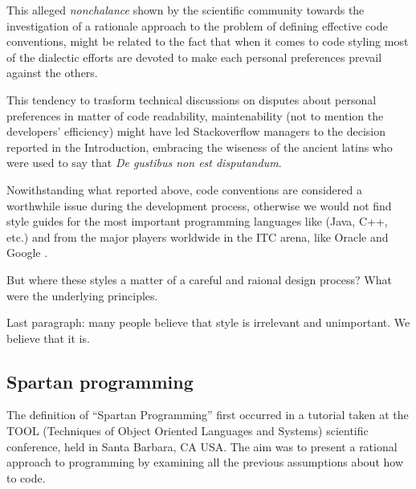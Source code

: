 This alleged \emph{nonchalance} shown by the scientific community towards the investigation 
of a rationale approach to the problem of defining effective code conventions, might be 
related to the fact that when it comes to code styling most of the dialectic efforts are devoted
to make each personal preferences prevail against the others.

This tendency to trasform technical discussions on disputes about personal preferences 
in matter of code readability, maintenability (not to mention the developers' efficiency) might 
have led Stackoverflow managers to the decision reported in the Introduction, embracing the 
wiseness of the ancient latins who were used to say that \emph{De gustibus non est disputandum}.

Nowithstanding what reported above, code conventions are considered a worthwhile issue during 
the development process, otherwise we would not find style guides for the most important 
programming languages like (Java, C++, etc.) and from the major players worldwide in 
the ITC arena, like Oracle and Google \cite{}. 

But where these styles a matter of a careful and raional design process?
What were the underlying principles.

Last paragraph: many people believe that style is irrelevant and unimportant.
We believe that it is.

\subsection{Spartan programming}


The definition of ``Spartan Programming'' first occurred in a tutorial taken at 
the TOOL (Techniques of Object Oriented Languages and Systems) scientific conference, 
held in Santa Barbara, CA USA. %
The aim was to present a rational approach to programming by examining all the previous 
assumptions about how to code.

